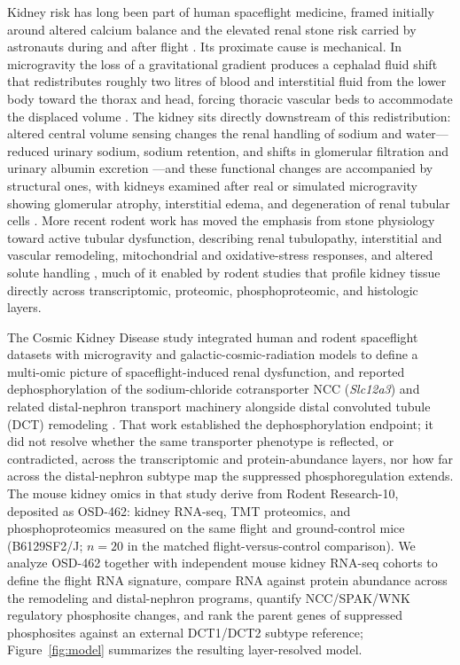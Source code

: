 \documentclass[11pt]{article}
\newcommand{\gene}[1]{\textit{#1}}
\begin{document}
Kidney risk has long been part of human spaceflight medicine, framed initially around altered calcium balance and the elevated renal stone risk carried by astronauts during and after flight \citep{cockett1962astronautical,pietrzyk2007renal,smith2014men}. Its proximate cause is mechanical. In microgravity the loss of a gravitational gradient produces a cephalad fluid shift that redistributes roughly two litres of blood and interstitial fluid from the lower body toward the thorax and head, forcing thoracic vascular beds to accommodate the displaced volume \citep{spacekidney2023}. The kidney sits directly downstream of this redistribution: altered central volume sensing changes the renal handling of sodium and water---reduced urinary sodium, sodium retention, and shifts in glomerular filtration and urinary albumin excretion \citep{christensen2001renal,drummer2001water}---and these functional changes are accompanied by structural ones, with kidneys examined after real or simulated microgravity showing glomerular atrophy, interstitial edema, and degeneration of renal tubular cells \citep{liakopoulos2012kidney}. More recent rodent work has moved the emphasis from stone physiology toward active tubular dysfunction, describing renal tubulopathy, interstitial and vascular remodeling, mitochondrial and oxidative-stress responses, and altered solute handling \citep{afshinnekoo2020fundamental,daSilveira2020comprehensive,chouker2025impact}, much of it enabled by rodent studies that profile kidney tissue directly across transcriptomic, proteomic, phosphoproteomic, and histologic layers.

The Cosmic Kidney Disease study integrated human and rodent spaceflight datasets with microgravity and galactic-cosmic-radiation models to define a multi-omic picture of spaceflight-induced renal dysfunction, and reported dephosphorylation of the sodium-chloride cotransporter NCC (\gene{Slc12a3}) and related distal-nephron transport machinery alongside distal convoluted tubule (DCT) remodeling \citep{siew2024cosmic}. That work established the dephosphorylation endpoint; it did not resolve whether the same transporter phenotype is reflected, or contradicted, across the transcriptomic and protein-abundance layers, nor how far across the distal-nephron subtype map the suppressed phosphoregulation extends. The mouse kidney omics in that study derive from Rodent Research-10, deposited as OSD-462: kidney RNA-seq, TMT proteomics, and phosphoproteomics measured on the same flight and ground-control mice (B6129SF2/J; $n=20$ in the matched flight-versus-control comparison). We analyze OSD-462 together with independent mouse kidney RNA-seq cohorts to define the flight RNA signature, compare RNA against protein abundance across the remodeling and distal-nephron programs, quantify NCC/SPAK/WNK regulatory phosphosite changes, and rank the parent genes of suppressed phosphosites against an external DCT1/DCT2 subtype reference; Figure~\ref{fig:model} summarizes the resulting layer-resolved model.
\end{document}
